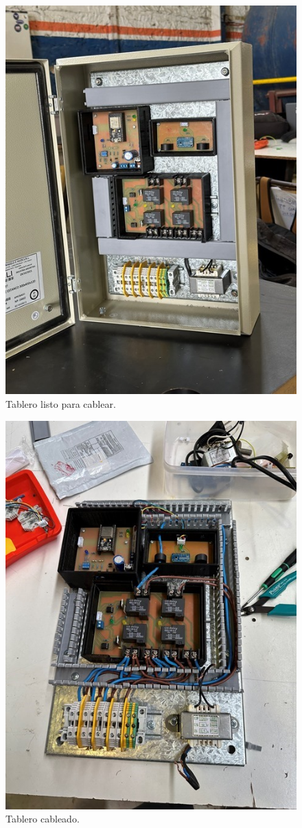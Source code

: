 \begin{figure}[H]
    \centering
    \includegraphics[width=0.75\linewidth]{informes/IMG_9294.jpg}
    \caption{Tablero listo para cablear.}
\end{figure}

\begin{figure}[H]
    \centering
    \includegraphics[width=0.75\linewidth]{informes/IMG_9305.jpg}
    \caption{Tablero cableado.}
\end{figure}

